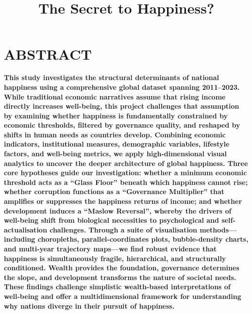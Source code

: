 \documentclass[conference]{IEEEtran}
\begin{document}
\title{The Secret to Happiness?}

\author{
\and
{}
\and
{}
}
\maketitle

\section*{\textbf{ABSTRACT}}
\noindent
\textbf{This study investigates the structural determinants of national happiness using a comprehensive global dataset spanning 2011--2023. While traditional economic narratives assume that rising income directly increases well-being, this project challenges that assumption by examining whether happiness is fundamentally constrained by economic thresholds, filtered by governance quality, and reshaped by shifts in human needs as countries develop. Combining economic indicators, institutional measures, demographic variables, lifestyle factors, and well-being metrics, we apply high-dimensional visual analytics to uncover the deeper architecture of global happiness. Three core hypotheses guide our investigation: whether a minimum economic threshold acts as a ``Glass Floor'' beneath which happiness cannot rise; whether corruption functions as a ``Governance Multiplier'' that amplifies or suppresses the happiness returns of income; and whether development induces a ``Maslow Reversal'', whereby the drivers of well-being shift from biological necessities to psychological and self-actualisation challenges. Through a suite of visualisation methods—including choropleths, parallel-coordinates plots, bubble-density charts, and multi-year trajectory maps—we find robust evidence that happiness is simultaneously fragile, hierarchical, and structurally conditioned. Wealth provides the foundation, governance determines the slope, and development transforms the nature of societal needs. These findings challenge simplistic wealth-based interpretations of well-being and offer a multidimensional framework for understanding why nations diverge in their pursuit of happiness.}
\end{document}
